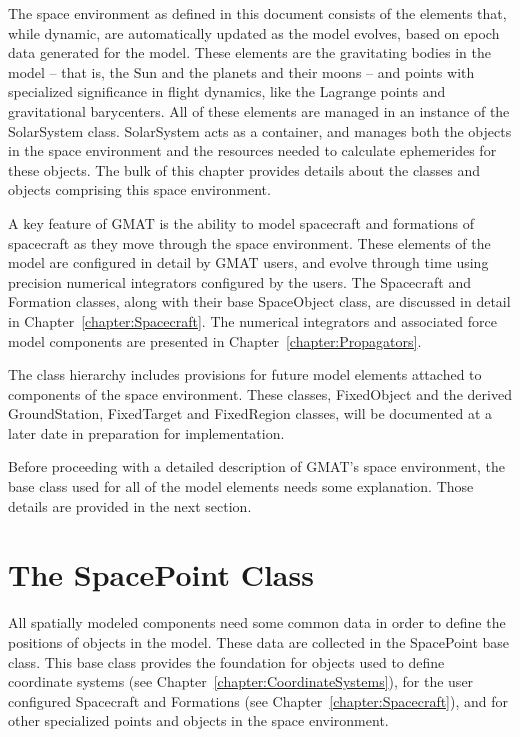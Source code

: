 The space environment as defined in this document consists of the elements that, while dynamic, are
automatically updated as the model evolves, based on epoch data generated for the model.  These
elements are the gravitating bodies in the model -- that is, the Sun and the planets and their moons
-- and points with specialized significance in flight dynamics, like the Lagrange points and
gravitational barycenters.  All of these elements are managed in an instance of the SolarSystem
class. SolarSystem acts as a container, and manages both the objects in the space environment and
the resources needed to calculate ephemerides for these objects.  The bulk of this chapter provides
details about the classes and objects comprising this space environment.

A key feature of GMAT is the ability to model spacecraft and formations of spacecraft as they move
through the space environment.  These elements of the model are configured in detail by GMAT users,
and evolve through time using precision numerical integrators configured by the users.  The
Spacecraft and Formation classes, along with their base SpaceObject class, are discussed in detail
in Chapter~\ref{chapter:Spacecraft}.  The numerical integrators and associated force model
components are presented in Chapter~\ref{chapter:Propagators}.

The class hierarchy includes provisions for future model elements attached to components of the
space environment.  These classes, FixedObject and the derived GroundStation, FixedTarget and
FixedRegion classes, will be documented at a later date in preparation for implementation.

Before proceeding with a detailed description of GMAT's space environment, the base class used for
all of the model elements needs some explanation.  Those details are provided in the next section.

\section{\label{section:SpacePoint}The SpacePoint Class}

All spatially modeled components need some common data in order to define the positions of objects
in the model.  These data are collected in the SpacePoint base class.  This base class provides the
foundation for objects used to define coordinate systems (see
Chapter~\ref{chapter:CoordinateSystems}), for the user configured Spacecraft and Formations (see
Chapter~\ref{chapter:Spacecraft}), and for other specialized points and objects in the space
environment.

